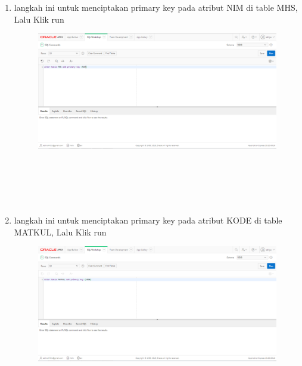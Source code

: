 \documentclass[12pt, times new roman, a4paper]{article}
\begin{document}
\begin{enumerate}
\item langkah ini untuk menciptakan primary key pada atribut NIM di table MHS, Lalu Klik run 
\begin{figure} [h]
	\centering
		\includegraphics[scale=0.4]{gambar/11}
\end{figure}
\\
\\
\\
\\
\item langkah ini untuk menciptakan primary key pada atribut KODE di table MATKUL, Lalu Klik run 
\begin{figure} [h]
	\centering
		\includegraphics[scale=0.4]{gambar/12}
\end{figure}


\end{enumerate}
\end{document}
